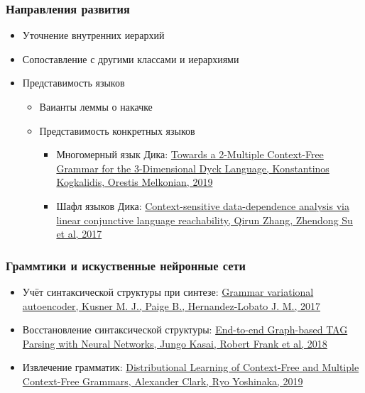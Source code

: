 \documentclass{beamer}
\begin{document}
\begin{frame}[fragile]

  \frametitle{Направления развития}

  \begin{itemize}
    \item Уточнение внутренних иерархий
    \item Сопоставление с другими классами и иерархиями
    \item Представимость языков
    \begin{itemize}
      \item Ваианты леммы о накачке
      \item Представимость конкретных языков
      \begin{itemize}
        \item Многомерный язык Дика: \href{https://link.springer.com/chapter/10.1007/978-3-662-59620-3_5}{Towards a 2-Multiple Context-Free Grammar for the 3-Dimensional Dyck Language, Konstantinos Kogkalidis, Orestis Melkonian, 2019}
        \item Шафл языков Дика: \href{https://dl.acm.org/doi/10.1145/3093333.3009848}{Context-sensitive data-dependence analysis via linear conjunctive language reachability, Qirun Zhang, Zhendong Su et al, 2017}
      \end{itemize}
    \end{itemize}
  \end{itemize}

\end{frame}

\begin{frame}[fragile]

  \frametitle{Граммтики и искуственные нейронные сети}

\begin{itemize}
    \item Учёт синтаксической структуры при синтезе: \href{https://dl.acm.org/doi/10.5555/3305381.3305582}{Grammar variational autoencoder, Kusner M. J., Paige B., Hernandez-Lobato J. M., 2017}
    \item Восстановление синтаксической структуры: \href{https://arxiv.org/abs/1804.06610}{End-to-end Graph-based TAG Parsing with Neural Networks, Jungo Kasai, Robert Frank et al, 2018}
    \item Извлечение грамматик: \href{https://link.springer.com/chapter/10.1007/978-3-662-48395-4_6}{Distributional Learning of Context-Free and Multiple Context-Free Grammars, Alexander Clark, Ryo Yoshinaka, 2019}
  \end{itemize}


\end{frame}
\end{document}
